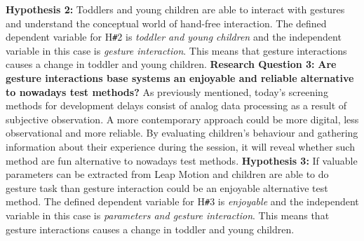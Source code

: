 \newline
\textbf{Hypothesis 2:} Toddlers and young children are able to interact with gestures and understand the conceptual world of hand-free interaction.
\vspace{3mm} %
\hfill \break
The defined dependent variable for H\texttt{\#}2 is \textit{toddler and young children} and the independent variable in this case is \textit{gesture interaction}. This means that gesture interactions causes a change in toddler and young children.
\vspace{5mm} %
\hfill \break
\textbf{Research Question 3:}\newline
\textbf{Are gesture interactions base systems an enjoyable and reliable alternative to nowadays test methods?}
\newline
As previously mentioned, today's screening methods for development delays consist of analog data processing as a result of subjective observation. A more contemporary approach could be more digital, less observational and more reliable. By evaluating children's behaviour and gathering information about their experience during the session, it will reveal whether such method are fun alternative to nowadays test methods.  
\newline
\textbf{Hypothesis 3:} If valuable parameters can be extracted from Leap Motion and children are able to do gesture task than gesture interaction could be an enjoyable alternative test method.
\vspace{3mm} %
\hfill \break
The defined dependent variable for H\texttt{\#}3 is \textit{enjoyable} and the independent variable in this case is \textit{parameters and gesture interaction}. This means that gesture interactions causes a change in toddler and young children.











